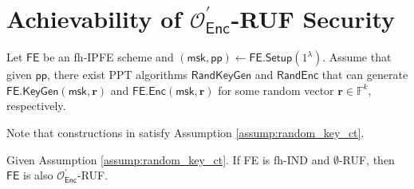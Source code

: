 
\newpage



\iffalse

\section{Achievability of $\mathcal{O}^\prime_{\textsf{Enc}}$-RUF Security}

\begin{assumption}
\label{assump:random_key_ct}

Let $\textsf{FE}$ be an fh-IPFE scheme and $(\textsf{msk}, \textsf{pp}) \gets \textsf{FE.Setup}(1^\lambda)$. Assume that given $\textsf{pp}$, there exist PPT algorithms $\textsf{RandKeyGen}$ and $\textsf{RandEnc}$ that can generate $\textsf{FE.KeyGen}(\textsf{msk}, \mathbf{r})$ and $\textsf{FE.Enc}(\textsf{msk}, \mathbf{r})$ for some random vector $\mathbf{r} \in \mathbb{F}^k$, respectively.

\end{assumption}

Note that constructions in \cite{10.1007/978-3-319-45871-7_24, cryptoeprint:2016/440} satisfy Assumption \ref{assump:random_key_ct}.

\begin{theorem}
\label{thm:fh-IPFE:ind-OEnc-ruf}
Given Assumption \ref{assump:random_key_ct}. If \textsf{FE} is fh-IND and $\emptyset$-RUF, then $\textsf{FE}$ is also $\mathcal{O}^\prime_{\textsf{Enc}}$-RUF.

\end{theorem}

